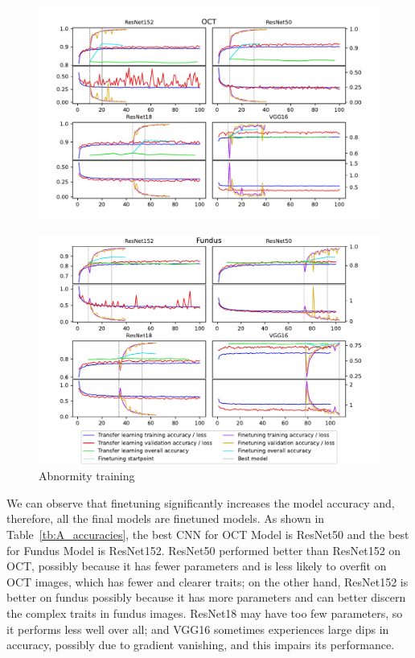 \documentclass{article}
\begin{document}
	\begin{figure}[htbp]
		\centering
		\includegraphics[width=\linewidth]{Figs/abnormity_OCT_loss_and_acc.pdf}
	\end{figure}
	\begin{figure}[htbp]
		\centering
		\vspace{-1cm}
		\includegraphics[width=\linewidth]{Figs/abnormity_Fundus_loss_and_acc.pdf}
		\caption{Abnormity training}
		\vspace{0.3cm}
		\label{fig:A_train}
	\end{figure}
	
	\vspace{0.3cm}
	
	We can observe that finetuning significantly increases the model accuracy and, therefore, all the final models are finetuned models. As shown in Table~\ref{tb:A_accuracies}, the best CNN for OCT Model is ResNet50 and the best for Fundus Model is ResNet152. ResNet50 performed better than ResNet152 on OCT, possibly because it has fewer parameters and is less likely to overfit on OCT images, which has fewer and clearer traits; on the other hand, ResNet152 is better on fundus possibly because it has more parameters and can better discern the complex traits in fundus images. ResNet18 may have too few parameters, so it performs less well over all; and VGG16 sometimes experiences large dips in accuracy, possibly due to gradient vanishing, and this impairs its performance. 
	
\end{document}
